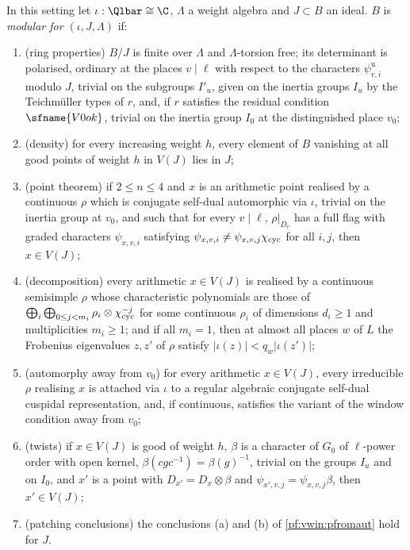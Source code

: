 \begin{definition}\label{pf:modularity:moddef}
In this setting let $\iota:\Qlbar\cong\C$, $\Lambda$ a weight algebra and $J\subset B$ an ideal. $B$ is \emph{modular for
$(\iota,J,\Lambda)$} if:
\begin{enumerate}[label=(Mod\arabic*)]
\item (ring properties) $B/J$ is finite over $\Lambda$ and $\Lambda$-torsion free; its determinant is polarised, ordinary
at the places $v\mid\ell$ with respect to the characters $\psi^{\mathrm u}_{v,i}$ modulo $J$, trivial on the subgroups
$I'_u$, given on the inertia groups $I_u$ by the Teichm\"uller types of $r$, and, if $r$ satisfies the residual condition
$\sfname{V0ok}$, trivial on the inertia group $I_0$ at the distinguished place $v_0$;
\item (density) for every increasing weight $h$, every element of $B$ vanishing at all good points of weight $h$ in
$V(J)$ lies in $J$;
\item (point theorem) if $2\le n\le4$ and $x$ is an arithmetic point realised by a continuous $\rho$ which is conjugate
self-dual automorphic via $\iota$, trivial on the inertia group at $v_0$, and such that for every $v\mid\ell$,
$\rho|_{D_v}$ has a full flag with graded characters $\psi_{x,v,i}$ satisfying
$\psi_{x,v,i}\ne\psi_{x,v,j}\chi_{\mathrm{cyc}}$ for all $i,j$, then $x\in V(J)$;
\item (decomposition) every arithmetic $x\in V(J)$ is realised by a continuous semisimple $\rho$ whose characteristic
polynomials are those of $\bigoplus_i\bigoplus_{0\le j<m_i}\rho_i\otimes\chi_{\mathrm{cyc}}^{-j}$ for some continuous $\rho_i$
of dimensions $d_i\ge1$ and multiplicities $m_i\ge1$; and if all $m_i=1$, then at almost all places $w$ of $L$ the
Frobenius eigenvalues $z,z'$ of $\rho$ satisfy $|\iota(z)|<q_w|\iota(z')|$;
\item (automorphy away from $v_0$) for every arithmetic $x\in V(J)$, every irreducible $\rho$ realising $x$ is attached via
$\iota$ to a regular algebraic conjugate self-dual cuspidal representation, and, if continuous, satisfies the variant of
the window condition away from $v_0$;
\item (twists) if $x\in V(J)$ is good of weight $h$, $\beta$ is a character of $G_0$ of $\ell$-power order with open kernel,
$\beta(cgc^{-1})=\beta(g)^{-1}$, trivial on the groups $I_u$ and on $I_0$, and $x'$ is a point with
$D_{x'}=D_x\otimes\beta$ and $\psi_{x',v,j}=\psi_{x,v,j}\beta$, then $x'\in V(J)$;
\item (patching conclusions) the conclusions (a) and (b) of \cref{pf:vwin:pfromaut} hold for $J$.

\end{enumerate}
\end{definition}
